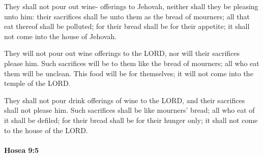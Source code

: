 			\begin{versebox}
					\item[BHS] 
					\item[LXX] 
					\item[ASV] They shall not pour out wine- offerings to Jehovah, neither shall they be pleasing unto him: their sacrifices shall be unto them as the bread of mourners; all that eat thereof shall be polluted; for their bread shall be for their appetite; it shall not come into the house of Jehovah.
					\item[NIV] They will not pour out wine offerings to the LORD, nor will their sacrifices please him. Such sacrifices will be to them like the bread of mourners; all who eat them will be unclean. This food will be for themselves; it will not come into the temple of the LORD.
					\item[NRSV] They shall not pour drink offerings of wine to the LORD, and their sacrifices shall not please him. Such sacrifices shall be like mourners’ bread; all who eat of it shall be defiled; for their bread shall be for their hunger only; it shall not come to the house of the LORD.
			\end{versebox}

		\paragraph{Hosea 9:5} %
			\label{HOSEA-9-5}

